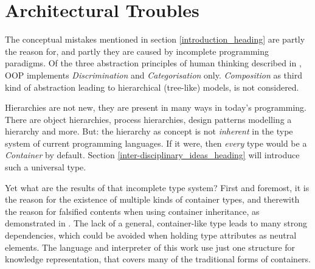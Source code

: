 %
%
%
%
%
%
%

\section{Architectural Troubles}
\label{architectural_troubles_heading}

The conceptual mistakes mentioned in section \ref{introduction_heading} are
partly the reason for, and partly they are caused by incomplete programming
paradigms. Of the three abstraction principles of human thinking described in
\cite{heller2004}, OOP implements \emph{Discrimination} and
\emph{Categorisation} only. \emph{Composition} as third kind of abstraction
leading to hierarchical (tree-like) models, is not considered.

Hierarchies are not new, they are present in many ways in today's programming.
There are object hierarchies, process hierarchies, design patterns modelling a
hierarchy and more. But: the hierarchy as concept is not \emph{inherent} in the
type system of current programming languages. If it were, then \emph{every}
type would be a \emph{Container} by default. Section
\ref{inter-disciplinary_ideas_heading} will introduce such a universal type.

Yet what are the results of that incomplete type system? First and foremost,
it is the reason for the existence of multiple kinds of container types, and
therewith the reason for falsified contents when using container inheritance,
as demonstrated in \cite{javaiaq}. The lack of a general, container-like type
leads to many strong dependencies, which could be avoided when holding type
attributes as neutral elements. The language and interpreter of this work use
just one structure for knowledge representation, that covers many of the
traditional forms of containers.

